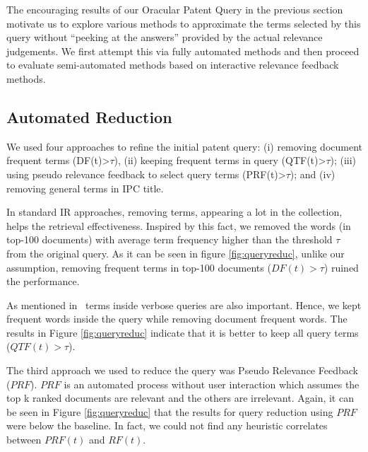 The encouraging results of our Oracular Patent Query in the previous
section motivate us to explore various methods to approximate the terms
selected by this query without ``peeking at the answers'' provided by
the actual relevance judgements.  We first attempt this via fully
automated methods and then proceed to evaluate semi-automated methods
based on interactive relevance feedback methods.

\subsection{Automated Reduction}
%
We used four approaches to refine the initial patent query: (i) removing document frequent terms (DF(t)>$\tau$), (ii) keeping frequent terms in query (QTF(t)>$\tau$); (iii) using pseudo relevance feedback to select query terms (PRF(t)>$\tau$); and (iv) removing general terms in IPC title. 

In standard IR approaches, removing terms, appearing a lot in the collection, helps the retrieval effectiveness. Inspired by this fact, we removed the words (in top-100 documents) with average term frequency higher than the threshold $\tau$ from the original query. As it can be seen in figure \ref{fig:queryreduc}, unlike our assumption, removing frequent terms in top-100 documents ($DF(t)>\tau$) ruined the performance.  

As mentioned in~\cite{maxwell2013compact} terms inside verbose queries are also important. Hence, we kept frequent words inside the query while removing document frequent words. The results in Figure \ref{fig:queryreduc} indicate that it is better to keep all query terms ($QTF(t)>\tau$). 

The third approach we used to reduce the query was Pseudo Relevance Feedback ($\mathit{PRF}$). $\mathit{PRF}$ is an automated process without user interaction which assumes the top k ranked documents are relevant and the others are irrelevant. Again, it can be seen in Figure \ref{fig:queryreduc} that the results for query reduction using $\mathit{PRF}$ were below the baseline. In fact, we could not find any heuristic correlates between  $ PRF(t)$ and $ RF(t)$. 

